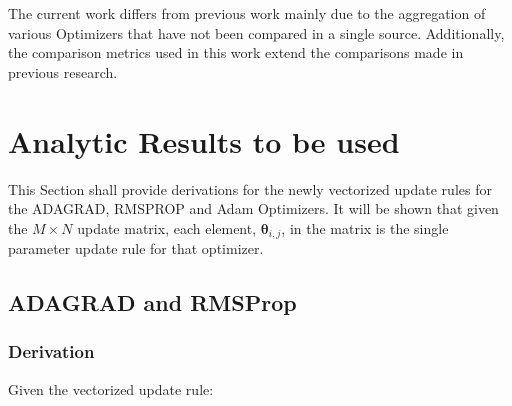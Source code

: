 \documentclass{article}
\begin{document}
The current work differs from previous work mainly due to the aggregation of various Optimizers that have not been compared in a single source. Additionally, the comparison metrics used in this work extend the comparisons made in previous research. 

\section{Analytic Results to be used}
This Section shall provide derivations for the newly vectorized update rules for the ADAGRAD, RMSPROP and Adam Optimizers. It will be shown that given the $M \times N$ update matrix, each element, $\boldsymbol{\theta}_{i,j}$,  in the matrix is the single parameter update rule for that optimizer.

\subsection{ADAGRAD and RMSProp}
\subsubsection{Derivation}
Given the vectorized update rule: \hfill\newline
\end{document}
